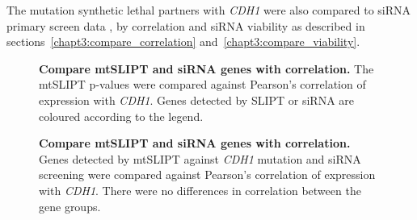 The mutation synthetic lethal partners with \textit{CDH1} were also compared to siRNA primary screen data \citep{Telford2015}, by correlation and siRNA viability as described in sections~\ref{chapt3:compare_correlation} and~\ref{chapt3:compare_viability}.

\begin{figure}[!htp]
\begin{center}
   \end{center}
   \caption[Compare mtSLIPT and siRNA genes with correlation]{\small \textbf{Compare mtSLIPT and siRNA genes with correlation.} The mtSLIPT p-values were compared against Pearson's correlation of expression with \textit{CDH1}. Genes detected by SLIPT or siRNA are coloured according to the legend. 
}
\label{fig:compare_points_correlation_mtSL}

\begin{center}
   \end{center}
   \caption[Compare mtSLIPT and siRNA genes with correlation]{\small \textbf{Compare mtSLIPT and siRNA genes with correlation.}  Genes detected by mtSLIPT against \textit{CDH1} mutation and siRNA screening were compared against Pearson's correlation of expression with \textit{CDH1}. There were no differences in correlation between the gene groups. 
}
\label{fig:compare_correlation_mtSL}
\end{figure}

